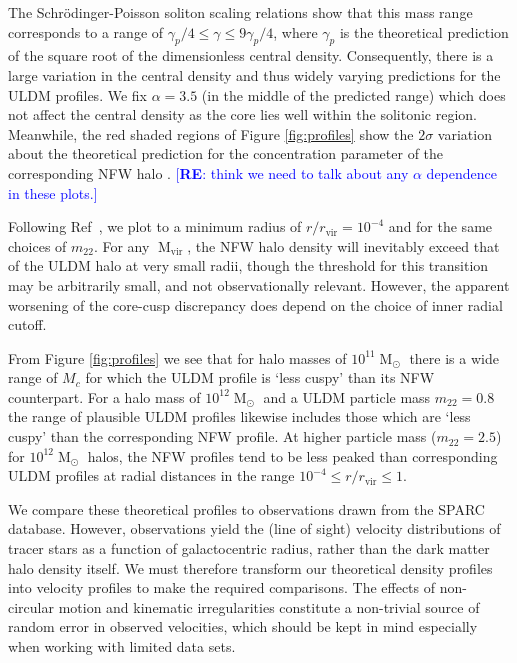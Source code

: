 \documentclass{pasa}%
\newcommand{\re}[1]{\textcolor{blue}{[{\bf RE}: #1]}}
\begin{document}
 The  Schr{\"o}dinger-Poisson soliton scaling relations show that this mass range corresponds to a range of $ \gamma_p /4 \leq \gamma \leq 9\gamma_p/4$, where $\gamma_p$ is the theoretical prediction of the square root of the dimensionless central density. Consequently, there is a large variation in the central density and thus widely varying predictions for the  ULDM profiles. We fix $\alpha = 3.5$ (in the middle of the predicted range) which does not affect the central density as the core lies well within the solitonic region. Meanwhile, the red shaded regions of Figure \ref{fig:profiles} show the $2\sigma$ variation about the theoretical prediction for the concentration parameter of the corresponding NFW halo \cite{Maccio:2008pcd}. \re{think  we need to talk about any $\alpha$ dependence in these plots.}



Following Ref~\cite{Robles:2018fur}, we plot to a minimum radius of $r/r_{\mathrm{vir}} = 10^{-4}$ and for the same choices of $m_{22}$. For any $\operatorname{M}_{\mathrm{vir}}$, the NFW halo density  will inevitably exceed that of the ULDM halo at very small radii, though the threshold for this transition may be arbitrarily small, and not observationally relevant. However, the apparent worsening of the core-cusp discrepancy does depend on the choice of inner radial cutoff.

From Figure \ref{fig:profiles} we see that for halo masses of $10^{11}\operatorname{M}_{\odot}$ there is a wide range of $M_c$ for which the ULDM profile is `less cuspy' than its NFW counterpart. For a halo mass of $10^{12}\operatorname{M}_{\odot}$ and a ULDM particle mass $m_{22}=0.8$ the range of plausible ULDM profiles likewise includes those which are `less cuspy' than the corresponding NFW profile. At higher particle mass ($m_{22}=2.5$) for $10^{12}\operatorname{M}_{\odot}$ halos, the NFW profiles tend to be less peaked than corresponding ULDM profiles at radial distances in  the range $10^{-4}\leq r/r_{\mathrm{vir}} \leq 1$.  

We compare these theoretical profiles to observations drawn from the SPARC database.  However, observations yield the (line of sight) velocity distributions of tracer stars as a function of galactocentric radius, rather than the dark matter halo density itself. We must therefore transform our theoretical density profiles into velocity profiles to make the required comparisons. The effects of non-circular motion and kinematic irregularities constitute a non-trivial source of random error in observed velocities, which should be kept in mind especially when working with limited data sets. 
\end{document}
